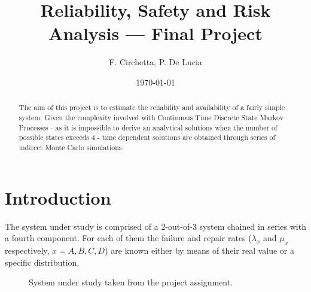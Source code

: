 \documentclass[a4paper,11pt]{article}
\title{Reliability, Safety and Risk Analysis --- Final Project}
\author{F. Circhetta, P. De Lucia}
\date{\today}
\begin{document}
\maketitle

\begin{abstract}
The aim of this project is to estimate the reliability and availability of a
fairly simple system. Given the complexity involved with Continuous Time
Discrete State Markov Processes - as it is impossible to derive an analytical
solutions when the number of possible states exceeds 4 - time dependent
solutions are obtained through series of indirect Monte Carlo simulations.
\end{abstract}

\section{Introduction}

The system under study is comprised of a 2-out-of-3 system chained in series
with a fourth component. For each of them the failure and repair rates
($\lambda_x$ and $\mu_x$ respectively, $x = A,B,C,D$) are known either by means
of their real value or a specific distribution.

\hspace{2em}

\begin{figure}[ht]
    \centering
    \caption{System under study taken from the project assignment.}
\end{figure}
\end{document}

